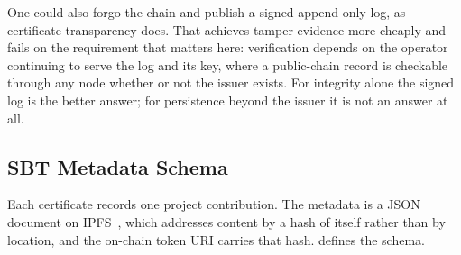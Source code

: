 One could also forgo the chain and publish a signed append-only log, as certificate
transparency does. That achieves tamper-evidence more cheaply and fails on the
requirement that matters here: verification depends on the operator continuing to
serve the log and its key, where a public-chain record is checkable through any node
whether or not the issuer exists. For integrity alone the signed log is the better
answer; for persistence beyond the issuer it is not an answer at all.

\subsection{SBT Metadata Schema}
\label{subsec:metadata}

Each certificate records one project contribution. The metadata is a JSON document
on IPFS~\cite{benet2014ipfs}, which addresses content by a hash of itself rather than
by location, and the on-chain token URI carries that hash.  defines
the schema.

